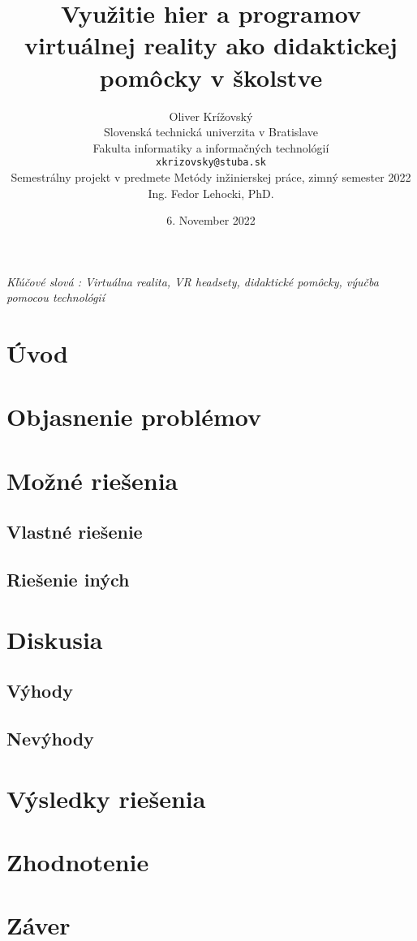\documentclass[10pt,oneside,slovak,a4paper]{article}
\title{\textbf{Využitie hier a programov virtuálnej reality ako didaktickej pomôcky v školstve}}
\author{
	Oliver Krížovský\\[2pt]
	{\small Slovenská technická univerzita v Bratislave}\\
	{\small Fakulta informatiky a informačných technológií}\\
	{\small \texttt{xkrizovsky@stuba.sk}}\\
	{\small Semestrálny projekt v predmete Metódy inžinierskej práce, zimný semester 2022}\\
	{\small Ing.  Fedor Lehocki,  PhD.}\\
}
\date{\small 6. November 2022}
\begin{document}
\maketitle
\begin{abstract}

\end{abstract}
\begin{center}
\emph{Kľúčové slová : Virtuálna realita, VR headsety, didaktické pomôcky, výučba pomocou technológií}
\end{center}
\section{Úvod}\label{uvod}

\section{Objasnenie problémov}\label{objasnenie}


\section{Možné riešenia}\label{riesenia}
\subsection{Vlastné riešenie}\label{riesenia:1}
\subsection{Riešenie iných}\label{riesenia:2}
\section{Diskusia}\label{diskusia}
\subsection{Výhody}\label{diskusia:1}
\subsection{Nevýhody}\label{diskusia:2}
\section{Výsledky riešenia}\label{vysledky}
\section{Zhodnotenie}\label{zhodnotenie}
\section{Záver}\label{zaver}


\end{document}

